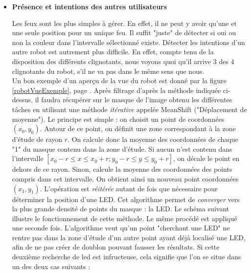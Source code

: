 \begin{itemize}
				\item \textbf{Présence et intentions des autres utilisateurs}

					Les feux sont les plus simples à gérer. En effet, il ne peut y avoir qu'une et une seule position pour un unique feu. Il suffit "juste" de détecter si oui ou non la couleur dans l'intervalle sélectionné existe. Détecter les intentions d'un autre robot est autrement plus difficile. En effet, compte tenu de la disposition des différents clignotants, nous voyons quoi qu'il arrive 3 des 4 clignotants du robot, s'il ne va pas dans le même sens que nous. \\
					Un bon exemple d'un aperçu de la vue du robot est donné par la figure \ref{robotVueExemple}, page \pageref{robotVueExemple}.
					Après filtrage d'après la méthode indiquée ci-dessus, il faudra récupérer sur le masque de l'image obtenu les différentes tâches en utilisant une méthode \textit{itérative} appelée MeanShift ("Déplacement de moyenne"). Le principe est simple : on choisit un point de coordonnées $(x_0,y_0)$. Autour de ce point, on définit une zone correspondant à la zone d'étude de rayon $r$. On calcule donc la moyenne des coordonnées de chaque "1" du masque contenu dans la zone d'étude. Si aucun n'est contenu dans l'intervalle $[x_0 - r \leqslant x \leqslant x_0 + r ; y_0 - r \leqslant y \leqslant y_0 + r ]$, on décale le point en dehors de ce rayon. Sinon, calcule la moyenne des coordonnées des points compris dans cet intervalle. On obtient ainsi un nouveau point coordonnées $(x_1,y_1)$. L'opération est \textit{réitérée} autant de fois que nécessaire pour déterminer la position d'une LED. Cet algorithme permet de \textit{converger} vers la plus grande densité de points du masque : la LED. Le schéma suivant illustre le fonctionnement de cette méthode.
					Le même procédé est appliqué une seconde fois. L'algorithme veut qu'un point "cherchant une LED" ne rentre pas dans la zone d'étude d'un autre point ayant déjà localisé une LED, afin de ne pas créer de doublon pouvant fausser les résultats. Si cette deuxième recherche de led est infructeuse, cela signifie que l'on se situe dans un des deux cas suivants :


\end{itemize}
